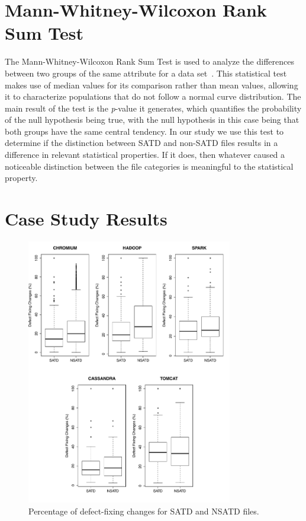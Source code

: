 \section{Mann-Whitney-Wilcoxon Rank Sum Test}
The Mann-Whitney-Wilcoxon Rank Sum Test is used to analyze the differences between two groups of the same attribute for a data set~\cite{mann1947test}. This statistical test makes use of median values for its comparison rather than mean values, allowing it to characterize populations that do not follow a normal curve distribution. The main result of the test is the \textit{p}-value it generates, which quantifies the probability of the null hypothesis being true, with the null hypothesis in this case being that both groups have the same central tendency. In our study we use this test to determine if the distinction between SATD and non-SATD files results in a difference in relevant statistical properties. If it does, then whatever caused a noticeable distinction between the file categories is meaningful to the statistical property. \\




\section{Case Study Results}
\label{chap3:sec:results}

\begin{figure}[tb]
	\centering
	\includegraphics[width=90mm]{figures/chapter3/rq1_correction}
	\caption{Percentage of defect-fixing changes for SATD and NSATD files.}
	\label{figure:number_of_fixing_changes_TD_vs_NTD}
\end{figure}

